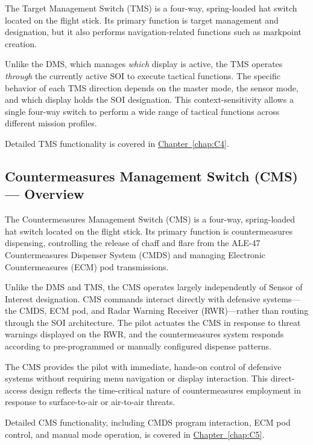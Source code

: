 \documentclass[11pt, a4paper, twoside]{report}
\newcommand{\chapref}[1]{\hyperref[#1]{Chapter~\ref*{#1}}}
\begin{document}
The Target Management Switch (TMS) is a four-way, spring-loaded hat switch located on the flight stick. Its primary function is target management and designation, but it also performs navigation-related functions such as markpoint creation.

Unlike the DMS, which manages \textit{which} display is active, the TMS operates \textit{through} the currently active SOI to execute tactical functions. The specific behavior of each TMS direction depends on the master mode, the sensor mode, and which display holds the SOI designation. This context-sensitivity allows a single four-way switch to perform a wide range of tactical functions across different mission profiles.

Detailed TMS functionality is covered in \chapref{chap:C4}.

\subsection{Countermeasures Management Switch (CMS) — Overview}
\label{sec:C2-S3-S3}

The Countermeasures Management Switch (CMS) is a four-way, spring-loaded hat switch located on the flight stick. Its primary function is countermeasures dispensing, controlling the release of chaff and flare from the ALE-47 Countermeasures Dispenser System (CMDS) and managing Electronic Countermeasures (ECM) pod transmissions.

Unlike the DMS and TMS, the CMS operates largely independently of Sensor of Interest designation. CMS commands interact directly with defensive systems—the CMDS, ECM pod, and Radar Warning Receiver (RWR)—rather than routing through the SOI architecture. The pilot actuates the CMS in response to threat warnings displayed on the RWR, and the countermeasures system responds according to pre-programmed or manually configured dispense patterns.

The CMS provides the pilot with immediate, hands-on control of defensive systems without requiring menu navigation or display interaction. This direct-access design reflects the time-critical nature of countermeasures employment in response to surface-to-air or air-to-air threats.

Detailed CMS functionality, including CMDS program interaction, ECM pod control, and manual mode operation, is covered in \chapref{chap:C5}.
\newpage
\end{document}
